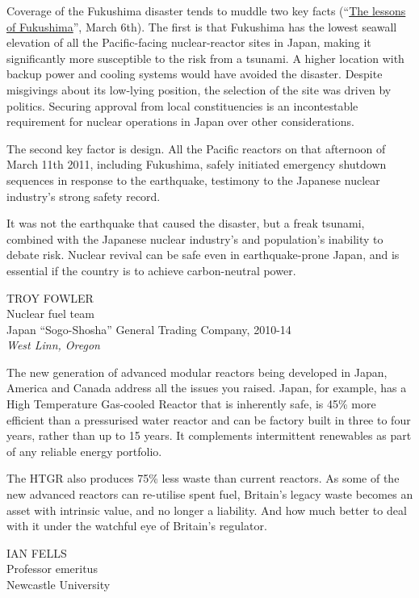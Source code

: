 \documentclass{article}
\begin{document}
Coverage of the Fukushima disaster tends to muddle two key facts (``\href{/leaders/2021/03/06/nuclear-power-must-be-well-regulated-not-ditched}{The lessons of Fukushima}'', March 6th). The first is that Fukushima has the lowest seawall elevation of all the Pacific-facing nuclear-reactor sites in Japan, making it significantly more susceptible to the risk from a tsunami. A higher location with backup power and cooling systems would have avoided the disaster. Despite misgivings about its low-lying position, the selection of the site was driven by politics. Securing approval from local constituencies is an incontestable requirement for nuclear operations in Japan over other considerations. 

The second key factor is design. All the Pacific reactors on that afternoon of March 11th 2011, including Fukushima, safely initiated emergency shutdown sequences in response to the earthquake, testimony to the Japanese nuclear industry's strong safety record. 

It was not the earthquake that caused the disaster, but a freak tsunami, combined with the Japanese nuclear industry's and population's inability to debate risk. Nuclear revival can be safe even in earthquake-prone Japan, and is essential if the country is to achieve carbon-neutral power. 

TROY FOWLER\\ Nuclear fuel team\\ Japan ``Sogo-Shosha'' General Trading Company, 2010-14\\ \emph{West Linn, Oregon} 

The new generation of advanced modular reactors being developed in Japan, America and Canada address all the issues you raised. Japan, for example, has a High Temperature Gas-cooled Reactor that is inherently safe, is 45\% more efficient than a pressurised water reactor and can be factory built in three to four years, rather than up to 15 years. It complements intermittent renewables as part of any reliable energy portfolio. 

The HTGR also produces 75\% less waste than current reactors. As some of the new advanced reactors can re-utilise spent fuel, Britain's legacy waste becomes an asset with intrinsic value, and no longer a liability. And how much better to deal with it under the watchful eye of Britain's regulator. 

IAN FELLS\\ Professor emeritus\\ Newcastle University 
\end{document}

